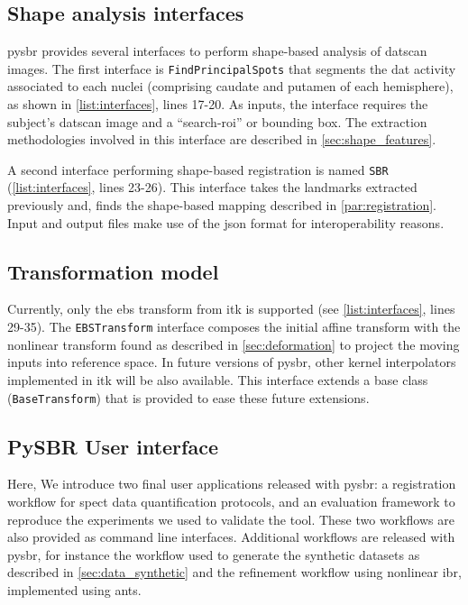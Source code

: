 \documentclass{frontiers}
\begin{document}
\subsection*{Shape analysis interfaces}
\label{supl:shapeanalysis}

\Gls*{pysbr} provides several interfaces to perform shape-based analysis of \gls*{datscan}
  images.
The first interface is \texttt{FindPrincipalSpots} that segments the \acrlong*{dat} activity
  associated to each nuclei (comprising caudate and putamen of each hemisphere),
  as shown in \autoref{list:interfaces}, lines 17-20.
As inputs, the interface requires the subject's \gls*{datscan} image and a ``search-\gls*{roi}'' or
  bounding box.
The extraction methodologies involved in this interface are described in \autoref{sec:shape_features}.

A second interface performing shape-based registration is named \texttt{SBR}
  (\autoref{list:interfaces}, lines 23-26).
This interface takes the landmarks extracted previously and, finds
  the shape-based mapping described in \autoref{par:registration}.
Input and output files make use of the \gls*{json} format
  for interoperability reasons.

\subsection*{Transformation model} %
Currently, only the \gls*{ebs} transform from \gls*{itk} is supported
  (see \autoref{list:interfaces}, lines 29-35).
The \texttt{EBSTransform} interface composes the initial affine transform
  with the nonlinear transform found as described in \autoref{sec:deformation}
  to project the moving inputs into reference space.
In future versions of \gls*{pysbr}, other kernel interpolators implemented in \gls*{itk} 
  will be also available.
This interface extends a base class (\texttt{BaseTransform}) that is provided to
  ease these future extensions.


\subsection*{PySBR User interface}
\label{supl:user_interface}

Here, We introduce two final user
  applications released with \gls*{pysbr}: a registration workflow for
  \gls*{spect} data quantification protocols, and an evaluation framework
  to reproduce the experiments we used to validate the tool.
These two workflows are also provided as command line interfaces.
Additional workflows are released with \gls*{pysbr}, for instance
  the workflow used to generate the synthetic datasets as described
  in \autoref{sec:data_synthetic} and the refinement workflow using
  nonlinear \gls*{ibr}, implemented using \gls*{ants}.
\end{document}
